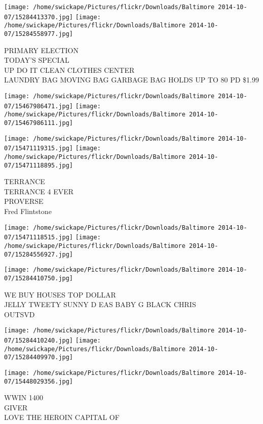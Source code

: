 \documentclass[10pt,letterpaper]{article}
\begin{document}
\texttt{[image: /home/swickape/Pictures/flickr/Downloads/Baltimore 2014-10-07/15284413370.jpg]}
\texttt{[image: /home/swickape/Pictures/flickr/Downloads/Baltimore 2014-10-07/15284558977.jpg]}

PRIMARY ELECTION\\
TODAY'S SPECIAL\\
UP DO IT CLEAN CLOTHES CENTER\\
LAUNDRY BAG MOVING BAG GARBAGE BAG HOLDS UP TO 80 PD \$1.99
\pagebreak

\texttt{[image: /home/swickape/Pictures/flickr/Downloads/Baltimore 2014-10-07/15467986471.jpg]}
\texttt{[image: /home/swickape/Pictures/flickr/Downloads/Baltimore 2014-10-07/15467986111.jpg]}

\texttt{[image: /home/swickape/Pictures/flickr/Downloads/Baltimore 2014-10-07/15471119315.jpg]}
\texttt{[image: /home/swickape/Pictures/flickr/Downloads/Baltimore 2014-10-07/15471118895.jpg]}

TERRANCE\\
TERRANCE 4 EVER\\
PROVERSE\\
Fred Flintstone
\pagebreak

\texttt{[image: /home/swickape/Pictures/flickr/Downloads/Baltimore 2014-10-07/15471118515.jpg]}
\texttt{[image: /home/swickape/Pictures/flickr/Downloads/Baltimore 2014-10-07/15284556927.jpg]}

\vspace{0.25in}
\texttt{[image: /home/swickape/Pictures/flickr/Downloads/Baltimore 2014-10-07/15284410750.jpg]}

WE BUY HOUSES TOP DOLLAR\\
JELLY TWEETY SUNNY D EAS BABY G BLACK CHRIS\\
OUTSVD
\pagebreak

\texttt{[image: /home/swickape/Pictures/flickr/Downloads/Baltimore 2014-10-07/15284410240.jpg]}
\texttt{[image: /home/swickape/Pictures/flickr/Downloads/Baltimore 2014-10-07/15284409970.jpg]}

\vspace{0.25in}
\texttt{[image: /home/swickape/Pictures/flickr/Downloads/Baltimore 2014-10-07/15448029356.jpg]}

WWIN 1400\\
GIVER\\
LOVE THE HEROIN CAPITAL OF
\pagebreak
\end{document}
